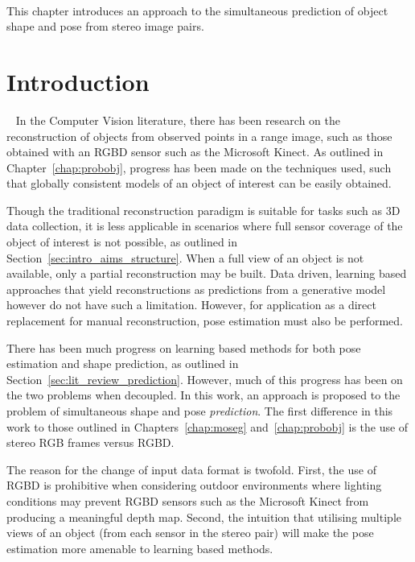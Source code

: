 ~\label{chap:spp}
\begin{chapterabstract}
This chapter introduces an approach to the simultaneous prediction of object shape 
and pose from stereo image pairs.
\end{chapterabstract}

\section{Introduction}
~\label{sec:spp_introduction}
In the Computer Vision literature, there has been research on the reconstruction of objects
from observed points in a range image, such as those obtained with an RGBD sensor such 
as the Microsoft Kinect. As outlined in Chapter~\ref{chap:probobj}, progress has been made 
on the techniques used, such that globally consistent models of an object of interest can be 
easily obtained.

Though the traditional reconstruction paradigm is suitable for tasks such as 3D data 
collection, it is less applicable in scenarios where full sensor coverage of the object 
of interest is not possible, as outlined in Section~\ref{sec:intro_aims_structure}. When a full 
view of an object is not available, only a partial reconstruction may be built. Data driven, 
learning based approaches that yield reconstructions as predictions from a generative model 
however do not have such a limitation. However, for application as a direct replacement for 
manual reconstruction, pose estimation must also be performed.

There has been much progress on learning based methods for both pose estimation and 
shape prediction, as outlined in Section~\ref{sec:lit_review_prediction}. However, much of 
this progress has been on the two problems when decoupled. In this work, an approach is 
proposed to the problem of simultaneous shape and pose \textit{prediction}. The first 
difference in this work to those outlined in Chapters~\ref{chap:moseg} and~\ref{chap:probobj} 
is the use of stereo RGB frames versus RGBD\@.

The reason for the change of input data format is twofold. First, the use of RGBD is prohibitive 
when considering outdoor environments where lighting conditions may prevent RGBD sensors such as the 
Microsoft Kinect from producing a meaningful depth map. Second, the intuition that utilising multiple 
views of an object (from each sensor in the stereo pair) will make the pose estimation more amenable to 
learning based methods.

